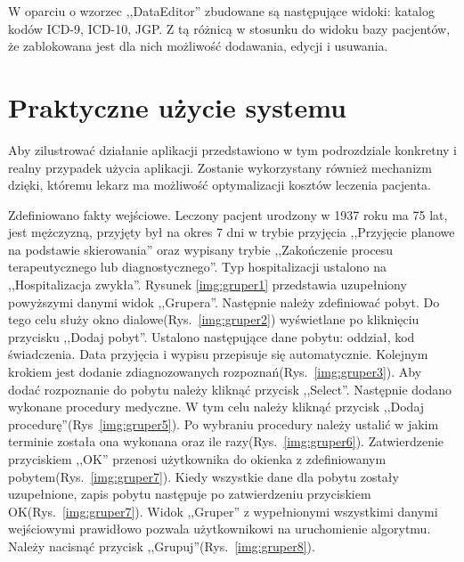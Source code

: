 W oparciu o wzorzec ,,DataEditor'' zbudowane są następujące widoki: katalog kodów \mbox{ICD-9}, \mbox{ICD-10}, JGP. Z tą różnicą w stosunku do widoku bazy pacjentów, że zablokowana jest dla nich możliwość dodawania, edycji i usuwania.


\section{Praktyczne użycie systemu}
\label{sec:praktyczneUzycieSystemu}
Aby zilustrować działanie aplikacji przedstawiono w tym podrozdziale konkretny i realny przypadek użycia aplikacji. Zostanie wykorzystany również mechanizm dzięki, któremu lekarz ma możliwość optymalizacji kosztów leczenia pacjenta.

Zdefiniowano fakty wejściowe. Leczony pacjent urodzony w 1937 roku ma 75 lat, jest mężczyzną, przyjęty był na okres 7 dni w trybie przyjęcia ,,Przyjęcie planowe na podstawie skierowania'' oraz wypisany trybie ,,Zakończenie procesu terapeutycznego lub diagnostycznego''. Typ hospitalizacji ustalono na ,,Hospitalizacja zwykła''. Rysunek \ref{img:gruper1} przedstawia uzupełniony powyższymi danymi widok ,,Grupera''. 
Następnie należy zdefiniować pobyt. Do tego celu służy okno dialowe(Rys.~\ref{img:gruper2}) wyświetlane po kliknięciu przycisku ,,Dodaj pobyt''. Ustalono następujące dane pobytu: oddział, kod świadczenia. Data przyjęcia i wypisu przepisuje się automatycznie.
Kolejnym krokiem jest dodanie zdiagnozowanych rozpoznań(Rys.~\ref{img:gruper3}). Aby dodać rozpoznanie do pobytu należy kliknąć przycisk ,,Select''.
Następnie dodano wykonane procedury medyczne. W tym celu należy kliknąć przycisk ,,Dodaj procedurę''(Rys~\ref{img:gruper5}).
Po wybraniu procedury należy ustalić w jakim terminie została ona wykonana oraz ile razy(Rys.~\ref{img:gruper6}).
Zatwierdzenie przyciskiem ,,OK'' przenosi użytkownika do okienka z zdefiniowanym pobytem(Rys.~\ref{img:gruper7}).
Kiedy wszystkie dane dla pobytu zostały uzupełnione, zapis pobytu następuje po zatwierdzeniu przyciskiem OK(Rys.~\ref{img:gruper7}).
Widok ,,Gruper'' z wypełnionymi wszystkimi danymi wejściowymi prawidłowo pozwala użytkownikowi na uruchomienie algorytmu. Należy nacisnąć przycisk ,,Grupuj''(Rys.~\ref{img:gruper8}).

